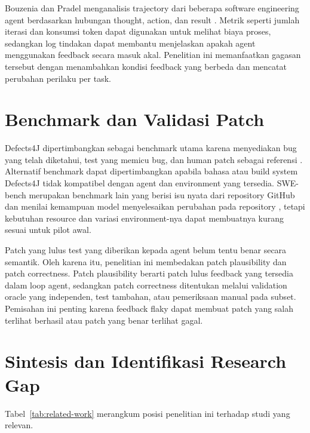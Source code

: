 Bouzenia dan Pradel menganalisis trajectory dari beberapa software engineering agent berdasarkan hubungan thought, action, dan result \cite{bouzenia2025trajectories}. Metrik seperti jumlah iterasi dan konsumsi token dapat digunakan untuk melihat biaya proses, sedangkan log tindakan dapat membantu menjelaskan apakah agent menggunakan feedback secara masuk akal. Penelitian ini memanfaatkan gagasan tersebut dengan menambahkan kondisi feedback yang berbeda dan mencatat perubahan perilaku per task.

\section{Benchmark dan Validasi Patch}

Defects4J dipertimbangkan sebagai benchmark utama karena menyediakan bug yang telah diketahui, test yang memicu bug, dan human patch sebagai referensi \cite{defects4j2014}. Alternatif benchmark dapat dipertimbangkan apabila bahasa atau build system Defects4J tidak kompatibel dengan agent dan environment yang tersedia. SWE-bench merupakan benchmark lain yang berisi isu nyata dari repository GitHub dan menilai kemampuan model menyelesaikan perubahan pada repository \cite{jimenez2024swebench}, tetapi kebutuhan resource dan variasi environment-nya dapat membuatnya kurang sesuai untuk pilot awal.

Patch yang lulus test yang diberikan kepada agent belum tentu benar secara semantik. Oleh karena itu, penelitian ini membedakan patch plausibility dan patch correctness. Patch plausibility berarti patch lulus feedback yang tersedia dalam loop agent, sedangkan patch correctness ditentukan melalui validation oracle yang independen, test tambahan, atau pemeriksaan manual pada subset. Pemisahan ini penting karena feedback flaky dapat membuat patch yang salah terlihat berhasil atau patch yang benar terlihat gagal.

\section{Sintesis dan Identifikasi Research Gap}

Tabel~\ref{tab:related-work} merangkum posisi penelitian ini terhadap studi yang relevan.

